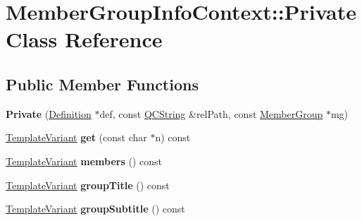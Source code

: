 \hypertarget{class_member_group_info_context_1_1_private}{}\section{Member\+Group\+Info\+Context\+::Private Class Reference}
\label{class_member_group_info_context_1_1_private}
\subsection*{Public Member Functions}
\begin{DoxyCompactItemize}
\item 
\mbox{\label{class_member_group_info_context_1_1_private_ade6f0ceb787d8b86d489a616721e34e3}} 
{\bfseries Private} (\mbox{\hyperlink{class_definition}{Definition}} $\ast$def, const \mbox{\hyperlink{class_q_c_string}{Q\+C\+String}} \&rel\+Path, const \mbox{\hyperlink{class_member_group}{Member\+Group}} $\ast$mg)
\item 
\mbox{\label{class_member_group_info_context_1_1_private_a4d0ad7fb7050833e2ce28df6c7be5f2e}} 
\mbox{\hyperlink{class_template_variant}{Template\+Variant}} {\bfseries get} (const char $\ast$n) const
\item 
\mbox{\label{class_member_group_info_context_1_1_private_a6ae8fb8272f2308b9865aa69e95d02b8}} 
\mbox{\hyperlink{class_template_variant}{Template\+Variant}} {\bfseries members} () const
\item 
\mbox{\label{class_member_group_info_context_1_1_private_a3907770cef72e7a9c3b518fea70fe79f}} 
\mbox{\hyperlink{class_template_variant}{Template\+Variant}} {\bfseries group\+Title} () const
\item 
\mbox{\label{class_member_group_info_context_1_1_private_a14da5cb4e0b675203fab454c3705e975}} 
\mbox{\hyperlink{class_template_variant}{Template\+Variant}} {\bfseries group\+Subtitle} () const
\item 
\mbox{\label{class_member_group_info_context_1_1_private_a65b380944192018c47ccc0f23d1a1f2d}} 

\end{DoxyCompactItemize}
